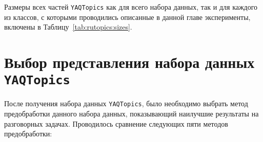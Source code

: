 Размеры всех частей \texttt{YAQTopics} как для всего набора данных, так и для каждого из классов, с которыми проводились описанные в данной главе эксперименты, включены в Таблицу~\ref{tab:rutopics:sizes}. 

\begin{table}[t]
\centering
{}
\caption{Размеры набора данных \texttt{YAQTopics} по классу и разбиению}
\label{tab:rutopics:sizes}
\end{table}


\section{Выбор представления набора данных \texttt{YAQTopics}}\label{rutopics:prepr} 

После получения набора данных \texttt{YAQTopics}, было необходимо выбрать метод предобработки данного набора данных, показывающий наилучшие результаты на разговорных задачах. Проводилось сравнение следующих пяти методов предобработки:

